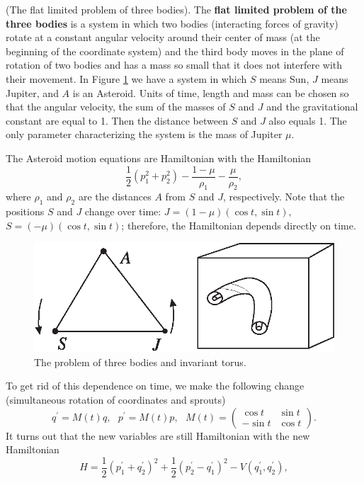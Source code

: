 \begin{example} (The flat limited problem of three bodies).
	The \textbf{flat limited problem of the three bodies} is a system in which two bodies (interacting forces of gravity) rotate at a constant angular velocity around their center of mass (at the beginning of the coordinate system) and the third body moves in the plane of rotation of two bodies and has a mass so small that it does not interfere with their movement. In Figure \ref{fig:4.3} we have a system in which $S$ means Sun, $J$ means Jupiter, and $A$ is an Asteroid. Units of time, length and mass can be chosen so that the angular velocity, the sum of  the masses of $S$ and $J$ and the gravitational constant are equal to 1. Then the distance between $S$ and $J$ also equals 1. The only parameter characterizing the system is the mass of Jupiter $\mu$.
	
	The Asteroid motion equations are Hamiltonian with the Hamiltonian
	$$
	\frac{1}{2}(p_{1}^{2}+p_{2}^{2})-\frac{1-\mu }{\rho _{1}}-\frac{\mu }{\rho_{2}},
	$$
	where $\rho _{1}$ and $\rho _{2}$ are the distances $A$ from $S$ and $J$, respectively. Note that the positions $S$ and $J$ change over time: $J=\left( 1-\mu \right) (\cos t,\sin t),$\ $S=(-\mu
	)\left( \cos t,\sin t\right)$; therefore, the Hamiltonian depends directly on time.
	\begin{figure}[!ht]
		\centering
		\includegraphics [scale=1.4]{jtr43}
		\caption{The problem of three bodies and invariant torus.}
		\label{fig:4.3}
	\end{figure}

	To get rid of this dependence on time, we make the following change (simultaneous rotation of coordinates and sprouts)
	$$
	q^{\prime }=M(t)q,\text{ \ \ }p^{\prime }=M(t)p,\text{ \ \ }M(t)=\left(
	\begin{array}{ll}
	\cos t & \sin t \\
	-\sin t & \cos t%
	\end{array}%
	\right) .
	$$
	It turns out that the new variables are still Hamiltonian with the new Hamiltonian
	\begin{equation}
	\label{4.10}
	H =\frac{1}{2}\left( p_{1}^{\prime }+q_{2}^{\prime }\right) ^{2}+\frac{1}{2%
	}\left( p_{2}^{\prime }-q_{1}^{\prime }\right) ^{2}-V(q_{1}^{\prime
	},q_{2}^{\prime }),
	\end{equation}
	

\end{example}

